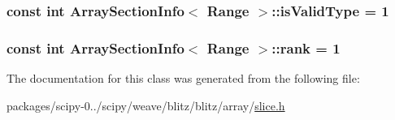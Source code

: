 \subsubsection[{is\+Valid\+Type}]{\setlength{\rightskip}{0pt plus 5cm}const int {\bf Array\+Section\+Info}$<$ {\bf Range} $>$\+::is\+Valid\+Type = 1\hspace{0.3cm}{\ttfamily [static]}}\label{classArraySectionInfo_3_01Range_01_4_ad99e8013ff0e87d680086c9865d602b6}
\hypertarget{classArraySectionInfo_3_01Range_01_4_ae3f83605b2721c37aff1af6a6aab5c9a}{}
\subsubsection[{rank}]{\setlength{\rightskip}{0pt plus 5cm}const int {\bf Array\+Section\+Info}$<$ {\bf Range} $>$\+::rank = 1\hspace{0.3cm}{\ttfamily [static]}}\label{classArraySectionInfo_3_01Range_01_4_ae3f83605b2721c37aff1af6a6aab5c9a}


The documentation for this class was generated from the following file\+:\begin{DoxyCompactItemize}
\item 
packages/scipy-\/0../scipy/weave/blitz/blitz/array/\hyperlink{slice_8h}{slice.\+h}\end{DoxyCompactItemize}
